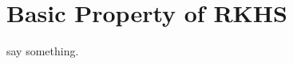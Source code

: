 \documentclass[a4paper,12pt]{article}
\begin{document}
\section{Basic Property of RKHS}
say something.
\end{document}
